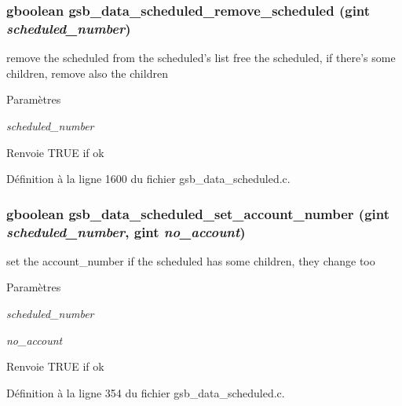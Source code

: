 \subsubsection[{gsb\_\-data\_\-scheduled\_\-remove\_\-scheduled}]{\setlength{\rightskip}{0pt plus 5cm}gboolean gsb\_\-data\_\-scheduled\_\-remove\_\-scheduled (gint {\em scheduled\_\-number})}\label{gsb__data__scheduled_8c_a234f69a2294c397daaa9e6ddd771e297}
remove the scheduled from the scheduled's list free the scheduled, if there's some children, remove also the children


\begin{DoxyParams}{Paramètres}
\item[{\em scheduled\_\-number}]\end{DoxyParams}
\begin{DoxyReturn}{Renvoie}
TRUE if ok 
\end{DoxyReturn}


Définition à la ligne 1600 du fichier gsb\_\-data\_\-scheduled.c.

\subsubsection[{gsb\_\-data\_\-scheduled\_\-set\_\-account\_\-number}]{\setlength{\rightskip}{0pt plus 5cm}gboolean gsb\_\-data\_\-scheduled\_\-set\_\-account\_\-number (gint {\em scheduled\_\-number}, \/  gint {\em no\_\-account})}\label{gsb__data__scheduled_8c_a07c390be754930ef6fc318936fb358bd}
set the account\_\-number if the scheduled has some children, they change too


\begin{DoxyParams}{Paramètres}
\item[{\em scheduled\_\-number}]\item[{\em no\_\-account}]\end{DoxyParams}
\begin{DoxyReturn}{Renvoie}
TRUE if ok 
\end{DoxyReturn}


Définition à la ligne 354 du fichier gsb\_\-data\_\-scheduled.c.

